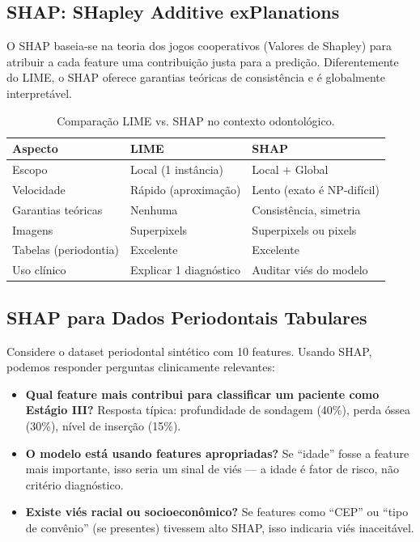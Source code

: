 \subsection{SHAP: SHapley Additive exPlanations}

O SHAP \cite{lundberg2017shap} baseia-se na teoria dos jogos cooperativos
(Valores de Shapley) para atribuir a cada feature uma contribuição justa
para a predição. Diferentemente do LIME, o SHAP oferece garantias teóricas
de consistência e é globalmente interpretável.

\begin{table}[H]
  \centering
  \caption{Comparação LIME vs. SHAP no contexto odontológico.}
  \label{tab:lime-shap}
  \begin{tabularx}{\textwidth}{lXX}
    \toprule
    \textbf{Aspecto} & \textbf{LIME} & \textbf{SHAP} \\
    \midrule
    Escopo & Local (1 instância) & Local + Global \\
    Velocidade & Rápido (aproximação) & Lento (exato é NP-difícil) \\
    Garantias teóricas & Nenhuma & Consistência, simetria \\
    Imagens & Superpixels & Superpixels ou pixels \\
    Tabelas (periodontia) & Excelente & Excelente \\
    Uso clínico & Explicar 1 diagnóstico & Auditar viés do modelo \\
    \bottomrule
  \end{tabularx}
\end{table}

\subsection{SHAP para Dados Periodontais Tabulares}

Considere o dataset periodontal sintético com 10 features. Usando SHAP,
podemos responder perguntas clinicamente relevantes:

\begin{itemize}
  \item \textbf{Qual feature mais contribui para classificar um paciente
    como Estágio III?} Resposta típica: profundidade de sondagem (40\%),
    perda óssea (30\%), nível de inserção (15\%).
  \item \textbf{O modelo está usando features apropriadas?} Se ``idade''
    fosse a feature mais importante, isso seria um sinal de viés — a idade
    é fator de risco, não critério diagnóstico.
  \item \textbf{Existe viés racial ou socioeconômico?} Se features como
    ``CEP'' ou ``tipo de convênio'' (se presentes) tivessem alto SHAP,
    isso indicaria viés inaceitável.
\end{itemize}

